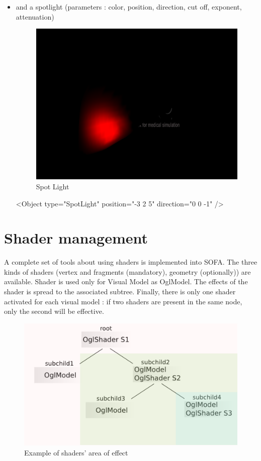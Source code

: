 \begin{itemize}
  \item and a spotlight (parameters : color, position, direction, cut off,
  exponent, attenuation)

	\begin{figure}[!h]
	\centering
	\includegraphics[width=0.33\linewidth]{rendering/images/light_spot.png}
	\caption{Spot Light}
	\end{figure}

	\begin{code_xml}
		<Object type="SpotLight" position="-3 2 5" direction="0 0 -1" />
	\end{code_xml}
\end{itemize}

\section{Shader management}
A complete set of tools about using shaders is implemented into SOFA. The three kinds of shaders (vertex and fragments (mandatory), geometry (optionally)) are available.
Shader is used only for Visual Model as OglModel.
\newline
The effects of the shader is spread to the associated subtree.
Finally, there is only one shader activated for each visual model : if two shaders are present in the same node, only the second will be effective.

	\begin{figure}[!h]
	\centering
	\includegraphics[width=0.8\linewidth]{rendering/images/shader_tree.png}
	\caption{Example of shaders' area of effect}
	\end{figure}

